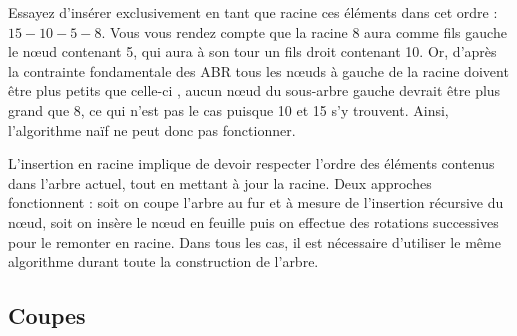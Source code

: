\documentclass[11pt,a4paper]{article}
\begin{document}
\smallskip

Essayez d'insérer exclusivement en tant que racine ces éléments dans cet ordre : $ 15 - 10 - 5 - 8 $.
Vous vous rendez compte que la racine 8 aura comme fils gauche le nœud contenant 5, qui aura à son tour un fils droit contenant 10.
Or, d'après la contrainte fondamentale des ABR \og tous les nœuds à gauche de la racine doivent être plus petits que celle-ci \fg{}, aucun nœud du sous-arbre gauche devrait être plus grand que 8, ce qui n'est pas le cas puisque 10 et 15 s'y trouvent.
Ainsi, l'algorithme naïf ne peut donc pas fonctionner.

\bigskip

L'insertion en racine implique de devoir respecter l'ordre des éléments contenus dans l'arbre actuel, tout en mettant à jour la racine.
Deux approches fonctionnent : soit on coupe l'arbre au fur et à mesure de l'insertion récursive du nœud, soit on insère le nœud en feuille puis on effectue des rotations successives pour le remonter en racine.
Dans tous les cas, il est nécessaire d'utiliser le même algorithme durant toute la construction de l'arbre.

\bigskip


\subsection{Coupes}

%
\end{document}
